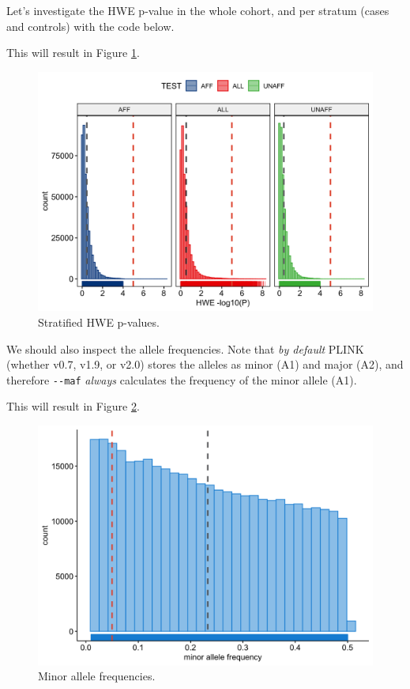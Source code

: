 \documentclass[
]{book}
\newcommand{\passthrough}[1]{#1}
\begin{document}
Let's investigate the HWE p-value in the whole cohort, and per stratum (cases and controls) with the code below.

This will result in Figure \ref{fig:show-wtccc1-hwe}.

\begin{figure}[H]

{\centering \includegraphics[width=0.85\linewidth]{img/_gwas_wtccc/WTCCC1-HWE} 

}

\caption{Stratified HWE p-values.}\label{fig:show-wtccc1-hwe}
\end{figure}

We should also inspect the allele frequencies. Note that \emph{by default} PLINK (whether v0.7, v1.9, or v2.0) stores the alleles as minor (A1) and major (A2), and therefore \passthrough{\lstinline!--maf!} \emph{always} calculates the frequency of the minor allele (A1).

This will result in Figure \ref{fig:show-wtccc1-freq}.

\begin{figure}[H]

{\centering \includegraphics[width=0.85\linewidth]{img/_gwas_wtccc/WTCCC1-FREQ} 

}

\caption{Minor allele frequencies.}\label{fig:show-wtccc1-freq}
\end{figure}
\end{document}
